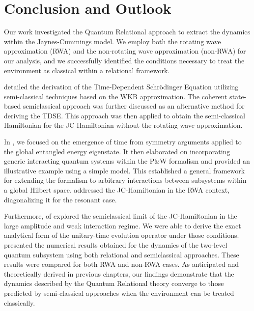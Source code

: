 \chapter{Conclusion and Outlook\label{chap:conclusion}}




Our work investigated the Quantum Relational approach to extract the dynamics within the Jaynes-Cummings model. We employ both the rotating wave approximation (RWA) and the non-rotating wave approximation (non-RWA) for our analysis, and we successfully identified the conditions necessary to treat the environment as classical within a relational framework.

 detailed the derivation of the Time-Dependent Schrödinger Equation utilizing semi-classical techniques based on the WKB approximation. The coherent state-based semiclassical approach was further discussed as an alternative method for deriving the TDSE. This approach was then applied to obtain the semi-classical Hamiltonian for the JC-Hamiltonian without the rotating wave approximation.

In , we focused on the emergence of time from symmetry arguments applied to the global entangled energy eigenstate. It then elaborated on incorporating generic interacting quantum systems within the P\&W formalism and provided an illustrative example using a simple model. This established a general framework for extending the formalism to arbitrary interactions between subsystems within a global Hilbert space.  addressed the JC-Hamiltonian in the RWA context, diagonalizing it for the resonant case. 

Furthermore,  of  explored the semiclassical limit of the JC-Hamiltonian in the large amplitude and weak interaction regime. We were able to derive the exact analytical form of the unitary-time evolution operator under those conditions.  presented the numerical results obtained for the dynamics of the two-level quantum subsystem using both relational and semiclassical approaches. These results were compared for both RWA and non-RWA cases. As anticipated and theoretically derived in previous chapters, our findings demonstrate that the dynamics described by the Quantum Relational theory converge to those predicted by semi-classical approaches when the environment can be treated classically.

